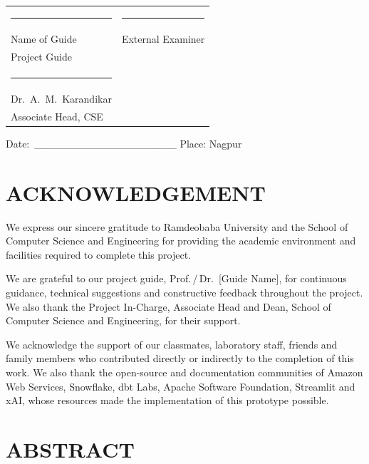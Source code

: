 \documentclass[12pt,a4paper]{report}
\begin{document}
\vspace{1.5cm}
\begin{tabular}{@{}p{}p{}@{}}
\rule{6.5cm}{0.4pt} & \rule{6.5cm}{0.4pt} \\
Name of Guide & External Examiner \\
Project Guide &  \\[1.5cm]
\rule{6.5cm}{0.4pt} \\
Dr.\ A.\ M.\ Karandikar \\
Associate Head, CSE & \\
\end{tabular}

\vspace{1.0cm}
\noindent Date:\ \_\_\_\_\_\_\_\_\_\_\_\_\_\_\_\_\_\_\_ \hfill Place: Nagpur

\chapter*{ACKNOWLEDGEMENT}

\noindent We express our sincere gratitude to Ramdeobaba University and the School of Computer Science and Engineering for providing the academic environment and facilities required to complete this project.

We are grateful to our project guide, Prof.\,/\,Dr.\ [Guide Name], for continuous guidance, technical suggestions and constructive feedback throughout the project. We also thank the Project In-Charge, Associate Head and Dean, School of Computer Science and Engineering, for their support.

We acknowledge the support of our classmates, laboratory staff, friends and family members who contributed directly or indirectly to the completion of this work. We also thank the open-source and documentation communities of Amazon Web Services, Snowflake, dbt Labs, Apache Software Foundation, Streamlit and xAI, whose resources made the implementation of this prototype possible.

\chapter*{ABSTRACT}
\end{document}
